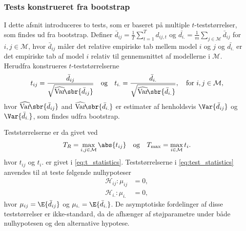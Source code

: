 \subsubsection{Tests konstrueret fra bootstrap}
I dette afsnit introduceres to tests, som er baseret på multiple \(t\)-teststørrelser, som findes ud fra bootstrap.
Definer \(\bar{d}_{ij} = \frac{1}{T} \sum_{t = 1}^T d_{ij,t}\) og \(\bar{d_{i.}} = \frac{1}{m} \sum_{j \in \mathcal{M}} \bar{d}_{ij}\) for \(i,j \in \mathcal{M}\), hvor \(\bar{d}_{ij}\) måler det relative empiriske tab mellem model \(i\) og \(j\) og \(\bar{d_{i.}}\) er det empiriske tab af model \(i\) relativ til gennemsnittet af modellerne i \(\mathcal{M}\). 
Herudfra konstrueres \(t\)-teststørrelserne
\begin{align}
t_{ij} = \frac{\bar{d}_{ij}}{\sqrt{\widehat{\mathrm{Var}}\!\sbr{\bar{d}_{ij}}}} \quad \text{og} \quad t_{i.} = \frac{\bar{d}_{i.}}{\sqrt{\widehat{\mathrm{Var}}\!\sbr{\bar{d}_{i.}}}}, \quad \text{for } i,j \in \mathcal{M}, \label{eq:t_statistics}
\end{align}
hvor \(\widehat{\mathrm{Var}}\!\sbr{\bar{d}_{ij}}\) and \(\widehat{\mathrm{Var}}\!\sbr{\bar{d}_{i.}}\) er estimater af henholdsvis \(\Var{\bar{d}_{ij}}\) og \(\Var{\bar{d}_{i.}}\), som findes udfra bootstrap.

Teststørrelserne er da givet ved
\begin{align} 
T_R = \max_{i,j \in \mathcal{M}} \abs{t_{ij}} \quad \text{og} \quad T_{\text{max}} = \max_{i \in \mathcal{M}} t_i. \label{eq:test_statistics}
\end{align}
hvor \(t_{ij}\) og \(t_i.\) er givet i \eqref{eq:t_statistics}.
Teststørrelserne i \eqref{eq:test_statistics} anvendes til at teste følgende nulhypoteser
\begin{align*}
\mathcal{H}_{ij}:\mu_{ij}&=0, \\
\mathcal{H}_{i.} : \mu_{i.}&=0,
\end{align*}
hvor \(\mu_{ij} = \E{\bar{d}_{ij}}\) og \(\mu_{i.} = \E{\bar{d}_{i.}}\).
De asymptotiske fordelinger af disse teststørrelser er ikke-standard, da de afhænger af støjparametre under både nulhypotesen og den alternative hypotese.
